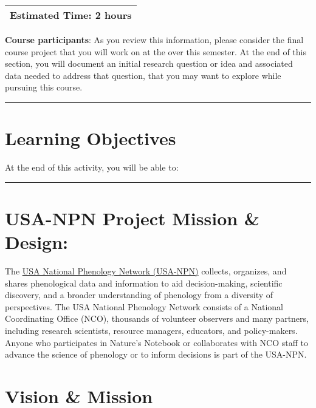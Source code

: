 \documentclass[]{book}
\begin{document}
\begin{longtable}[]{@{}l@{}}
\toprule
\endhead
Estimated Time: 2 hours\tabularnewline
\bottomrule
\end{longtable}

\leavevmode\hypertarget{ds-challenge}{}%
\textbf{Course participants}: As you review this information, please
consider the final course project
that you will work on at the over this semester. At the end of this section, you will
document an initial research question or idea and associated data needed to
address that question, that you may want to explore while pursuing this course.

\hypertarget{ds-objectives}{}
\begin{center}\rule{0.5\linewidth}{0.5pt}\end{center}

\hypertarget{learning-objectives}{%
\section{Learning Objectives}\label{learning-objectives}}

At the end of this activity, you will be able to:

\begin{center}\rule{0.5\linewidth}{0.5pt}\end{center}

\hypertarget{usa-npn-project-mission-design}{%
\section{USA-NPN Project Mission \& Design:}\label{usa-npn-project-mission-design}}

The \href{www.usanpn.org}{USA National Phenology Network (USA-NPN)} collects, organizes, and shares phenological data and information to aid decision-making, scientific discovery, and a broader understanding of phenology from a diversity of perspectives. The USA National Phenology Network consists of a National Coordinating Office (NCO), thousands of volunteer observers and many partners, including research scientists, resource managers, educators, and policy-makers. Anyone who participates in Nature's Notebook or collaborates with NCO staff to advance the science of phenology or to inform decisions is part of the USA-NPN.

\hypertarget{vision-mission}{%
\section{Vision \& Mission}\label{vision-mission}}
\end{document}
